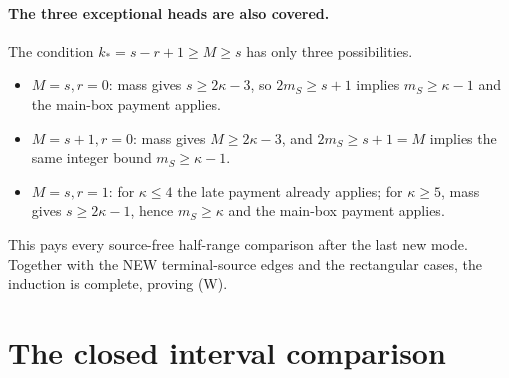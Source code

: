 \documentclass[11pt]{article}
\begin{document}
\paragraph{The three exceptional heads are also covered.}
The condition $k_*=s-r+1\ge M\ge s$ has only three possibilities.
\begin{itemize}
\item $M=s,r=0$: mass gives $s\ge2\kappa-3$, so
$2m_S\ge s+1$ implies $m_S\ge\kappa-1$ and the main-box payment applies.
\item $M=s+1,r=0$: mass gives $M\ge2\kappa-3$, and
$2m_S\ge s+1=M$ implies the same integer bound $m_S\ge\kappa-1$.
\item $M=s,r=1$: for $\kappa\le4$ the late payment already applies;
for $\kappa\ge5$, mass gives $s\ge2\kappa-1$, hence
$m_S\ge\kappa$ and the main-box payment applies.
\end{itemize}
This pays every source-free half-range comparison after the last new mode.
Together with the NEW terminal-source edges and the rectangular cases,
the induction is complete, proving (W).


\section{The closed interval comparison}

\par\medskip
\end{document}
